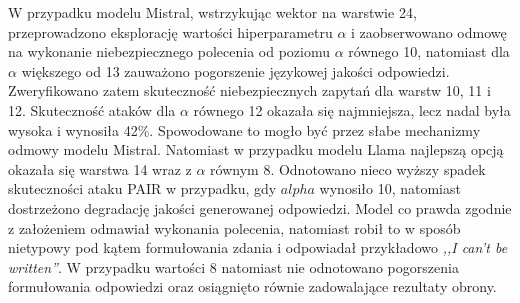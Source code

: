 W przypadku modelu Mistral, wstrzykując wektor na warstwie 24, przeprowadzono eksplorację wartości hiperparametru $\alpha$ i zaobserwowano odmowę na wykonanie niebezpiecznego polecenia od poziomu $\alpha$ równego 10, natomiast dla $\alpha$ większego od 13 zauważono pogorszenie językowej jakości odpowiedzi. Zweryfikowano zatem skuteczność niebezpiecznych zapytań dla warstw 10, 11 i 12. Skuteczność ataków dla $\alpha$ równego 12 okazała się najmniejsza, lecz nadal była wysoka i wynosiła 42\%. Spowodowane to mogło być przez słabe mechanizmy odmowy modelu Mistral. Natomiast w przypadku modelu Llama najlepszą opcją okazała się warstwa 14 wraz z $\alpha$ równym 8. Odnotowano nieco wyższy spadek skuteczności ataku \gls{PAIR} w przypadku, gdy $alpha$ wynosiło 10, natomiast dostrzeżono degradację jakości generowanej odpowiedzi. Model co prawda zgodnie z założeniem odmawiał wykonania polecenia, natomiast robił to w sposób nietypowy pod kątem formułowania zdania i odpowiadał przykładowo \textit{,,I can't be written''}. W przypadku wartości 8 natomiast nie odnotowano pogorszenia formułowania odpowiedzi oraz osiągnięto równie zadowalające rezultaty obrony.